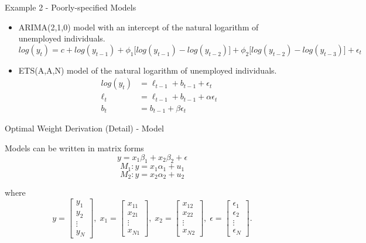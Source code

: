 \begin{frame}{Example 2 - Poorly-specified Models}

    \begin{itemize}
    \item ARIMA(2,1,0) model with an intercept of the natural logarithm of unemployed individuals.
    \begin{equation*}
    log(y_t) = c + log(y_{t-1}) + \phi_1\big[log(y_{t-1})-log(y_{t-2})\big] + \phi_2\big[log(y_{t-2})-log(y_{t-3})\big] + \epsilon_t
    \end{equation*}

    \item ETS(A,A,N) model of the natural logarithm of unemployed individuals. 
    \begin{align*}
    log(y_t) &= \ell_{t-1} + b_{t-1} + \epsilon_t \\
    \ell_t &= \ell_{t-1} + b_{t-1} + \alpha \epsilon_t \\
    b_t &= b_{t-1} + \beta \epsilon_t
    \end{align*}
    \end{itemize}
    
\end{frame}



\begin{frame}{Optimal Weight Derivation (Detail) - Model}

    Models can be written in matrix forms
\[y = x_1 \beta_{1} + x_2 \beta_{2} + \epsilon\]
\[ M_1 : y = x_1 \alpha_{1} + u_1\]
\[ M_2 : y = x_2 \alpha_{2} + u_2\]

where
\[
     {y}=\begin{bmatrix}
           y_{1} \\
           y_{2} \\
           \vdots \\
           y_{N}
         \end{bmatrix},\;
     {x_1}=\begin{bmatrix}
           x_{11} \\
           x_{21} \\
           \vdots \\
           x_{N1}
         \end{bmatrix},\;
    {x_2}=\begin{bmatrix}
           x_{12} \\
           x_{22} \\
           \vdots \\
           x_{N2}
         \end{bmatrix},\;
    {\epsilon}=\begin{bmatrix}
           \epsilon_{1} \\
           \epsilon_{2} \\
           \vdots \\
           \epsilon_{N}
         \end{bmatrix}.
\]

\end{frame}



